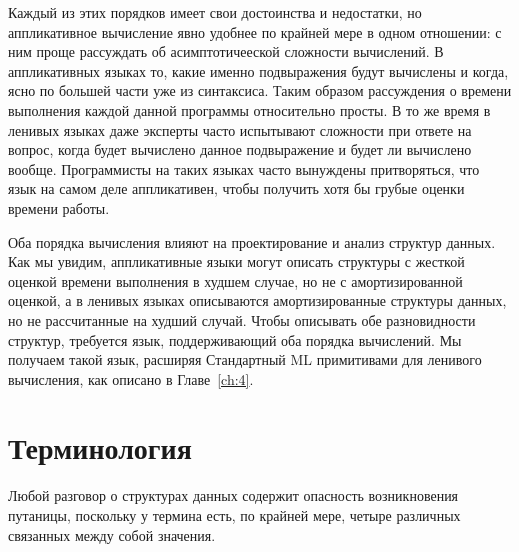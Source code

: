 Каждый из этих порядков имеет свои достоинства и недостатки, но
аппликативное вычисление явно удобнее по крайней мере в одном
отношении: с ним проще рассуждать об асимптотичееской сложности
вычислений.  В аппликативных языках то, какие именно подвыражения
будут вычислены и когда, ясно по большей части уже из синтаксиса.
Таким образом рассуждения о времени выполнения каждой данной программы
относительно просты.  В то же время в ленивых языках даже эксперты
часто испытывают сложности при ответе на вопрос, когда будет вычислено
данное подвыражение и будет ли вычислено вообще.  Программисты на
таких языках часто вынуждены притворяться, что язык на самом деле
аппликативен, чтобы получить хотя бы грубые оценки времени работы.

Оба порядка вычисления влияют на проектирование и анализ структур
данных. Как мы увидим, аппликативные языки могут описать структуры с
жесткой оценкой времени выполнения в худшем случае, но не с амортизированной
оценкой, а в ленивых языках описываются амортизированные структуры
данных, но не рассчитанные на худший случай. Чтобы описывать обе
разновидности структур, требуется язык, поддерживающий оба
порядка вычислений. Мы получаем такой язык, расширяя Стандартный ML
примитивами для ленивого вычисления, как описано в Главе~\ref{ch:4}.

\section{Терминология}

Любой разговор о структурах данных содержит опасность возникновения путаницы,
поскольку у термина  есть, по
крайней мере, четыре различных связанных между собой значения.

